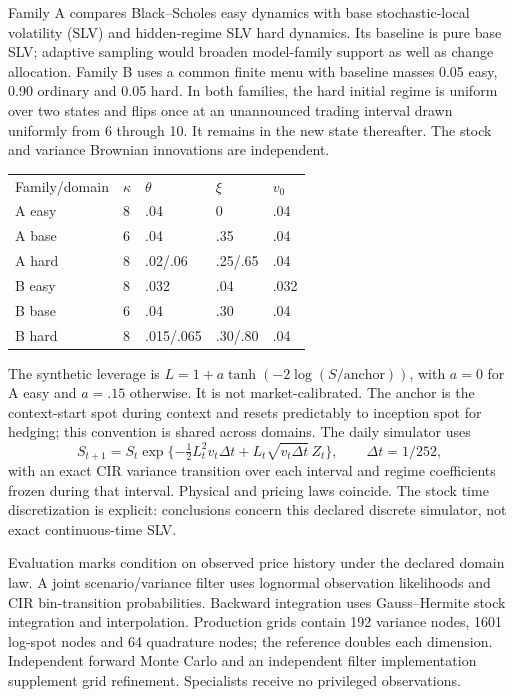 \documentclass{article}
\begin{document}
Family A compares Black--Scholes easy dynamics with base stochastic-local volatility (SLV) and hidden-regime SLV hard dynamics. Its baseline is pure base SLV; adaptive sampling would broaden model-family support as well as change allocation. Family B uses a common finite menu with baseline masses 0.05 easy, 0.90 ordinary and 0.05 hard. In both families, the hard initial regime is uniform over two states and flips once at an unannounced trading interval drawn uniformly from 6 through 10. It remains in the new state thereafter. The stock and variance Brownian innovations are independent.

\begin{center}
\begin{tabular}{lllll}
Family/domain & $\kappa$ & $\theta$ & $\xi$ & $v_0$ \\
A easy & 8 & .04 & 0 & .04 \\
A base & 6 & .04 & .35 & .04 \\
A hard & 8 & .02/.06 & .25/.65 & .04 \\
B easy & 8 & .032 & .04 & .032 \\
B base & 6 & .04 & .30 & .04 \\
B hard & 8 & .015/.065 & .30/.80 & .04
\end{tabular}
\end{center}

The synthetic leverage is $L=1+a\tanh(-2\log(S/\mathrm{anchor}))$, with $a=0$ for A easy and $a=.15$ otherwise. It is not market-calibrated. The anchor is the context-start spot during context and resets predictably to inception spot for hedging; this convention is shared across domains. The daily simulator uses
\[
S_{t+1}=S_t\exp\{-\tfrac12L_t^2v_t\Delta t+L_t\sqrt{v_t\Delta t}\,Z_t\},\qquad\Delta t=1/252,
\]
with an exact CIR variance transition over each interval and regime coefficients frozen during that interval. Physical and pricing laws coincide. The stock time discretization is explicit: conclusions concern this declared discrete simulator, not exact continuous-time SLV.

Evaluation marks condition on observed price history under the declared domain law. A joint scenario/variance filter uses lognormal observation likelihoods and CIR bin-transition probabilities. Backward integration uses Gauss--Hermite stock integration and interpolation. Production grids contain 192 variance nodes, 1601 log-spot nodes and 64 quadrature nodes; the reference doubles each dimension. Independent forward Monte Carlo and an independent filter implementation supplement grid refinement. Specialists receive no privileged observations.
\end{document}
